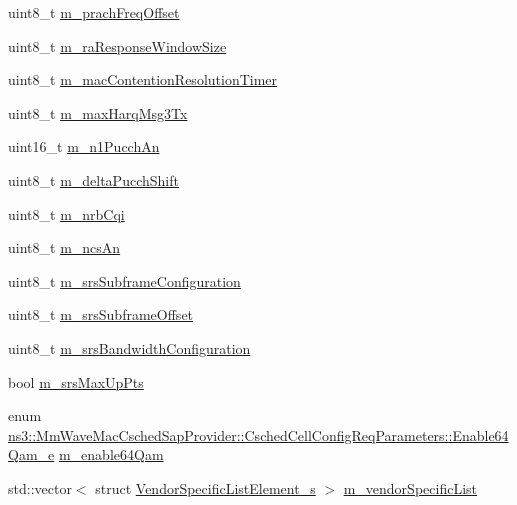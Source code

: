 \begin{DoxyCompactItemize}
uint8\+\_\+t \hyperlink{structns3_1_1MmWaveMacCschedSapProvider_1_1CschedCellConfigReqParameters_a3d3c29c0613f546f271974b4d0374cc6}{m\+\_\+prach\+Freq\+Offset}
\item 
uint8\+\_\+t \hyperlink{structns3_1_1MmWaveMacCschedSapProvider_1_1CschedCellConfigReqParameters_a739ea3386d24864db73ae6f8d26cef0e}{m\+\_\+ra\+Response\+Window\+Size}
\item 
uint8\+\_\+t \hyperlink{structns3_1_1MmWaveMacCschedSapProvider_1_1CschedCellConfigReqParameters_a8125928ffd9bb3165588f9308cce1312}{m\+\_\+mac\+Contention\+Resolution\+Timer}
\item 
uint8\+\_\+t \hyperlink{structns3_1_1MmWaveMacCschedSapProvider_1_1CschedCellConfigReqParameters_af3e128bd7783877af1ccdcec90c0b580}{m\+\_\+max\+Harq\+Msg3\+Tx}
\item 
uint16\+\_\+t \hyperlink{structns3_1_1MmWaveMacCschedSapProvider_1_1CschedCellConfigReqParameters_ab481ef8cc161149a9fcdcb34f1e8d0ce}{m\+\_\+n1\+Pucch\+An}
\item 
uint8\+\_\+t \hyperlink{structns3_1_1MmWaveMacCschedSapProvider_1_1CschedCellConfigReqParameters_ae5235ccb4d3688e550b27bc5bc1c2b80}{m\+\_\+delta\+Pucch\+Shift}
\item 
uint8\+\_\+t \hyperlink{structns3_1_1MmWaveMacCschedSapProvider_1_1CschedCellConfigReqParameters_a903be431ba7bfd10edcfbc594f87d3a1}{m\+\_\+nrb\+Cqi}
\item 
uint8\+\_\+t \hyperlink{structns3_1_1MmWaveMacCschedSapProvider_1_1CschedCellConfigReqParameters_a426af1e123debe80238532fccc748912}{m\+\_\+ncs\+An}
\item 
uint8\+\_\+t \hyperlink{structns3_1_1MmWaveMacCschedSapProvider_1_1CschedCellConfigReqParameters_af4ec241e6b520e13d978579bf8abf254}{m\+\_\+srs\+Subframe\+Configuration}
\item 
uint8\+\_\+t \hyperlink{structns3_1_1MmWaveMacCschedSapProvider_1_1CschedCellConfigReqParameters_aa97b1f9fa30af5e67e2f3ba358ea3429}{m\+\_\+srs\+Subframe\+Offset}
\item 
uint8\+\_\+t \hyperlink{structns3_1_1MmWaveMacCschedSapProvider_1_1CschedCellConfigReqParameters_a50b79628f9f2b65faae94efd0e185191}{m\+\_\+srs\+Bandwidth\+Configuration}
\item 
bool \hyperlink{structns3_1_1MmWaveMacCschedSapProvider_1_1CschedCellConfigReqParameters_a835d939ee03ccfeff453ec0f6473a0e1}{m\+\_\+srs\+Max\+Up\+Pts}
\item 
enum \hyperlink{structns3_1_1MmWaveMacCschedSapProvider_1_1CschedCellConfigReqParameters_ac9f44cddeba80ff870e32ffe07b070fb}{ns3\+::\+Mm\+Wave\+Mac\+Csched\+Sap\+Provider\+::\+Csched\+Cell\+Config\+Req\+Parameters\+::\+Enable64\+Qam\+\_\+e} \hyperlink{structns3_1_1MmWaveMacCschedSapProvider_1_1CschedCellConfigReqParameters_a16590040b6c1db4ea8b7461147b86e15}{m\+\_\+enable64\+Qam}
\item 
std\+::vector$<$ struct \hyperlink{structns3_1_1VendorSpecificListElement__s}{Vendor\+Specific\+List\+Element\+\_\+s} $>$ \hyperlink{structns3_1_1MmWaveMacCschedSapProvider_1_1CschedCellConfigReqParameters_a2173f23a7ae1d9066bec3da84326bc6b}{m\+\_\+vendor\+Specific\+List}
\end{DoxyCompactItemize}


